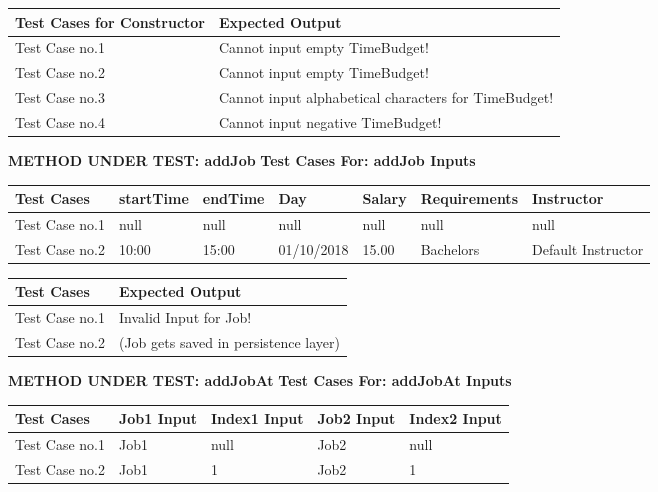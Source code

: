 \documentclass[12pt]{report}
\begin{document}
	\begin{flushleft}
		\begin{tabular}{ | l | l | }
			\hline
			Test Cases for Constructor & Expected Output \\ \hline
			Test Case no.1 & Cannot input empty TimeBudget! \\ \hline
			Test Case no.2 & Cannot input empty TimeBudget! \\ \hline
			Test Case no.3 & Cannot input alphabetical characters for TimeBudget!  \\ \hline
			Test Case no.4 & Cannot input negative TimeBudget!   \\ \hline
		\end{tabular}
	\end{flushleft}
	
	\newpage
	\textbf{METHOD UNDER TEST: addJob} \newline
	\textbf{Test Cases For: addJob Inputs} 
	\begin{flushleft}
		\begin{tabular}{ | l | l | l | l | l | l | l | }
			\hline
			Test Cases & startTime & endTime & Day & Salary & Requirements & Instructor \\ \hline
			Test Case no.1 & null & null & null & null & null & null \\ \hline
			Test Case no.2 & 10:00 & 15:00 & 01/10/2018 & 15.00 & Bachelors & Default Instructor \\ \hline
		\end{tabular}
	\end{flushleft}
	
	\begin{flushleft}
		\begin{tabular}{ | l | l | }
			\hline
			Test Cases & Expected Output \\ \hline
			Test Case no.1 & Invalid Input for Job! \\ \hline
			Test Case no.2 & (Job gets saved in persistence layer) \\ \hline
		\end{tabular}
	\end{flushleft}

	\textbf{METHOD UNDER TEST: addJobAt} \newline
	\textbf{Test Cases For: addJobAt Inputs}
	\begin{flushleft}
		\begin{tabular}{ | l | l | l | l | l | }
			\hline
			Test Cases & Job1 Input & Index1 Input & Job2 Input & Index2 Input \\ \hline
			Test Case no.1 & Job1 & null & Job2 & null \\ \hline
			Test Case no.2 & Job1 & 1 & Job2 & 1 \\ \hline
		\end{tabular}
	\end{flushleft}
	
\end{document}
